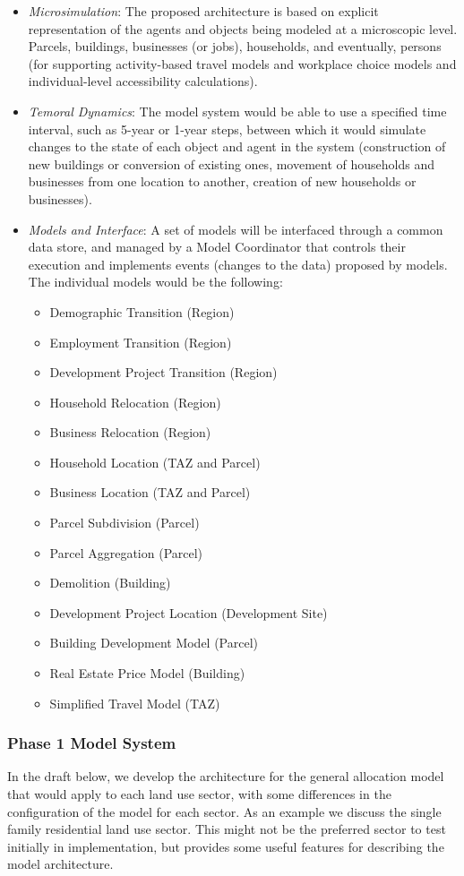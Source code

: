 \begin{itemize}
\item \emph{Microsimulation}: The proposed architecture is based on explicit representation of the agents and objects being modeled at a microscopic level.  Parcels, buildings, businesses (or jobs), households, and eventually, persons (for supporting activity-based travel models and workplace choice models and individual-level accessibility calculations).

\item \emph{Temoral Dynamics}: The model system would be able to use a specified time interval, such as 5-year or 1-year steps, between which it would simulate changes to the state of each object and agent in the system (construction of new buildings or conversion of existing ones, movement of households and businesses from one location to another, creation of new households or businesses).

\item \emph{Models and Interface}: A set of models will be interfaced through a common data store, and managed by a Model Coordinator that controls their execution and implements events (changes to the data) proposed by models.  The individual models would be the following:

\begin{itemize}
\item Demographic Transition (Region)
\item Employment Transition (Region)
\item Development Project Transition (Region)
\item Household Relocation (Region)
\item Business Relocation (Region)
\item Household Location (TAZ and Parcel)
\item Business Location (TAZ and Parcel)
\item Parcel Subdivision (Parcel)
\item Parcel Aggregation (Parcel)
\item Demolition (Building)
\item Development Project Location (Development Site)
\item Building Development Model (Parcel)
\item Real Estate Price Model (Building)
\item Simplified Travel Model (TAZ)
\end{itemize}
\end{itemize}


\subsubsection{Phase 1 Model System}
In the draft below, we develop the architecture for the general allocation model that would apply to each land use sector, with some differences in the configuration of the model for each sector.  As an example we discuss the single family residential land use sector.  This might not be the preferred sector to test initially in implementation, but provides some useful features for describing the model architecture.

